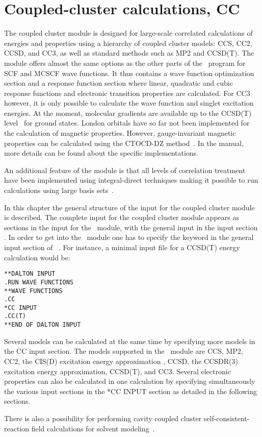 \chapter{Coupled-cluster calculations, CC}\label{ch:CC}

The coupled cluster module {\cc} is designed for large-scale
correlated calculations of energies and properties using a
hierarchy of coupled cluster models: CCS, CC2, CCSD, and CC3, as well as standard methods such as MP2 and CCSD(T).
The module offers almost the same options as the other
parts of the \dalton\ program for SCF and MCSCF wave functions.
It thus contains a wave function optimization section and 
a response function section
where linear, quadratic and cubic response functions and electronic
transition properties are calculated.
For CC3 however, it is only possible to calculate the wave function and 
singlet excitation energies.
At the moment, molecular gradients are available 
up to the CCSD(T) level~\cite{??} for ground states.  
London orbitals have so far not been implemented 
for the calculation of magnetic
properties.
However, gauge-invariant magnetic properties can be calculated using the
CTOCD-DZ method~\cite{ctocd,pccpcctocd}.
In the manual, more details can be found about the specific implementations.

An additional feature of the module is that all levels of correlation
treatment have been implemented using integral-direct techniques making
it possible to run calculations using large basis
sets~\cite{directCC}.

In this chapter the general structure of the input for the
coupled cluster module is described.
The complete input for the coupled cluster module appears as
sections in the input for the \sir\ module, with the general
input in the input section . In order to get into the \cc\ module
one has to specify the  keyword in the general input
section of \sir\ . For instance, a minimal
input file for a CCSD(T) energy calculation would be:
\begin{verbatim}
**DALTON INPUT
.RUN WAVE FUNCTIONS
**WAVE FUNCTIONS
.CC
*CC INPUT
.CC(T)
**END OF DALTON INPUT
\end{verbatim}

Several models can be calculated at the same time by specifying more models
in the CC input section. 
The models supported in the \cc\ module are 
CCS\cite{Christiansen:CPL243},
MP2\cite{Moller34},
CC2\cite{Christiansen:CPL243},
the CIS(D) excitation energy approximation \cite{Head-Gordon:94},
CCSD\cite{Purvis82},
the CCSDR(3) excitation energy approximation\cite{Christiansen:PERTURBATIVE_TRIPLES}, 
CCSD(T)\cite{Raghavachari89}, and CC3\cite{Christiansen:JCP103,Koch:JCP106}.
Several electronic properties can also 
be calculated in one calculation by specifying simultaneously 
the various input sections in the *CC INPUT section
as detailed in the following sections.

There is also a possibility for performing cavity coupled cluster
self-consistent-reaction field calculations for solvent modeling~\cite{???}.
